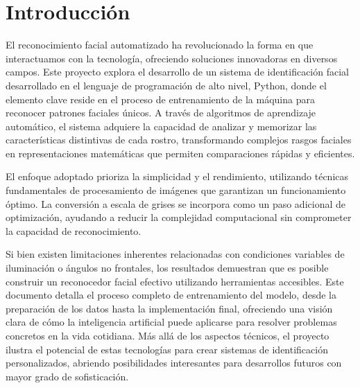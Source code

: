 \documentclass[12pt]{article}
\begin{document}
{\fontsize{12}{18}\selectfont %
\doublespacing
    
\sectionfont{\Large} 	%
\subsectionfont{\large} %
\subsubsectionfont{\normalsize}


\section{Introducción}
El reconocimiento facial automatizado ha revolucionado la forma en que interactuamos con la tecnología, ofreciendo soluciones innovadoras en diversos campos. Este proyecto explora el desarrollo de un sistema de identificación facial desarrollado en el lenguaje de programación de alto nivel, Python, donde el elemento clave reside en el proceso de entrenamiento de la máquina para reconocer patrones faciales únicos. A través de algoritmos de aprendizaje automático, el sistema adquiere la capacidad de analizar y memorizar las características distintivas de cada rostro, transformando complejos rasgos faciales en representaciones matemáticas que permiten comparaciones rápidas y eficientes.  

El enfoque adoptado prioriza la simplicidad y el rendimiento, utilizando técnicas fundamentales de procesamiento de imágenes que garantizan un funcionamiento óptimo. La conversión a escala de grises se incorpora como un paso adicional de optimización, ayudando a reducir la complejidad computacional sin comprometer la capacidad de reconocimiento.

Si bien existen limitaciones inherentes relacionadas con condiciones variables de iluminación o ángulos no frontales, los resultados demuestran que es posible construir un reconocedor facial efectivo utilizando herramientas accesibles. Este documento detalla el proceso completo de entrenamiento del modelo, desde la preparación de los datos hasta la implementación final, ofreciendo una visión clara de cómo la inteligencia artificial puede aplicarse para resolver problemas concretos en la vida cotidiana. Más allá de los aspectos técnicos, el proyecto ilustra el potencial de estas tecnologías para crear sistemas de identificación personalizados, abriendo posibilidades interesantes para desarrollos futuros con mayor grado de sofisticación.


}
\end{document}
